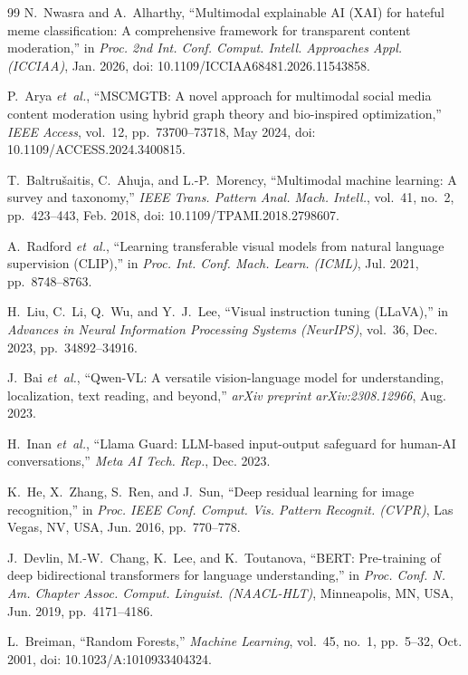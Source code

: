 \documentclass[12pt,a4paper]{report}
\begin{document}
\begin{thebibliography}{99}
N.~Nwasra and A.~Alharthy,
``Multimodal explainable AI (XAI) for hateful meme classification: A comprehensive framework for transparent content moderation,''
in \emph{Proc. 2nd Int. Conf. Comput. Intell. Approaches Appl. (ICCIAA)}, Jan. 2026, doi: 10.1109/ICCIAA68481.2026.11543858.

P.~Arya \emph{et~al.},
``MSCMGTB: A novel approach for multimodal social media content moderation using hybrid graph theory and bio-inspired optimization,''
\emph{IEEE Access}, vol.~12, pp.~73700--73718, May 2024, doi: 10.1109/ACCESS.2024.3400815.

T.~Baltru\v{s}aitis, C.~Ahuja, and L.-P.~Morency,
``Multimodal machine learning: A survey and taxonomy,''
\emph{IEEE Trans. Pattern Anal. Mach. Intell.}, vol.~41, no.~2, pp.~423--443, Feb. 2018, doi: 10.1109/TPAMI.2018.2798607.

A.~Radford \emph{et~al.},
``Learning transferable visual models from natural language supervision (CLIP),''
in \emph{Proc. Int. Conf. Mach. Learn. (ICML)}, Jul. 2021, pp.~8748--8763.

H.~Liu, C.~Li, Q.~Wu, and Y.~J.~Lee,
``Visual instruction tuning (LLaVA),''
in \emph{Advances in Neural Information Processing Systems (NeurIPS)}, vol.~36, Dec. 2023, pp.~34892--34916.

J.~Bai \emph{et~al.},
``Qwen-VL: A versatile vision-language model for understanding, localization, text reading, and beyond,''
\emph{arXiv preprint arXiv:2308.12966}, Aug. 2023.

H.~Inan \emph{et~al.},
``Llama Guard: LLM-based input-output safeguard for human-AI conversations,''
\emph{Meta AI Tech. Rep.}, Dec. 2023.

K.~He, X.~Zhang, S.~Ren, and J.~Sun,
``Deep residual learning for image recognition,''
in \emph{Proc. IEEE Conf. Comput. Vis. Pattern Recognit. (CVPR)}, Las Vegas, NV, USA, Jun. 2016, pp.~770--778.

J.~Devlin, M.-W.~Chang, K.~Lee, and K.~Toutanova,
``BERT: Pre-training of deep bidirectional transformers for language understanding,''
in \emph{Proc. Conf. N. Am. Chapter Assoc. Comput. Linguist. (NAACL-HLT)}, Minneapolis, MN, USA, Jun. 2019, pp.~4171--4186.

L.~Breiman,
``Random Forests,''
\emph{Machine Learning}, vol.~45, no.~1, pp.~5--32, Oct. 2001, doi: 10.1023/A:1010933404324.


\end{thebibliography}
\end{document}
